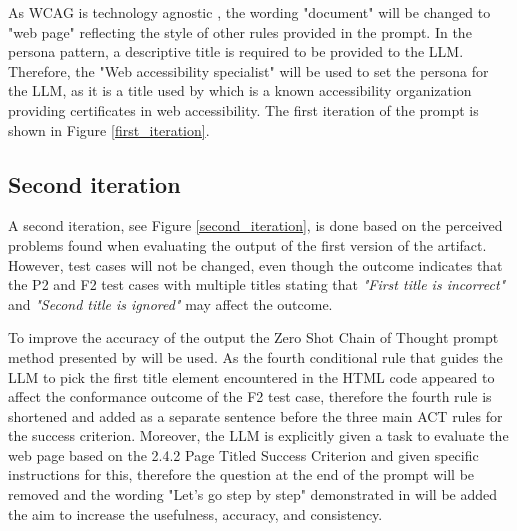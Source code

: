As WCAG is technology agnostic \citep{wcag22}, the wording "document" will be changed to "web page" reflecting the style of other rules provided in the prompt. In the persona pattern, a descriptive title is required to be provided to the LLM. Therefore, the "Web accessibility specialist" will be used to set the persona for the LLM, as it is a title used by \textcite{web_accessibility_specialist} which is a known accessibility organization providing certificates in web accessibility. The first iteration of the prompt is shown in Figure \ref{first_iteration}.


\subsection{Second iteration}

A second iteration, see Figure \ref{second_iteration}, is done based on the perceived problems found when evaluating the output of the first version of the artifact. However, test cases will not be changed, even though the outcome indicates that the P2 and F2 test cases with multiple titles stating that \textit{"First title is incorrect"} and \textit{"Second title is ignored"} may affect the outcome.

To improve the accuracy of the output the Zero Shot Chain of Thought prompt method presented by \textcite{kojima2023large} will be used. As the fourth conditional rule that guides the LLM to pick the first title element encountered in the HTML code appeared to affect the conformance outcome of the F2 test case, therefore the fourth rule is shortened and added as a separate sentence before the three main ACT rules for the success criterion. Moreover, the LLM is explicitly given a task to evaluate the web page based on the 2.4.2 Page Titled Success Criterion and given specific instructions for this, therefore the question at the end of the prompt will be removed and the wording "Let's go step by step" demonstrated in \textcite{kojima2023large} will be added the aim to increase the usefulness, accuracy, and consistency.

